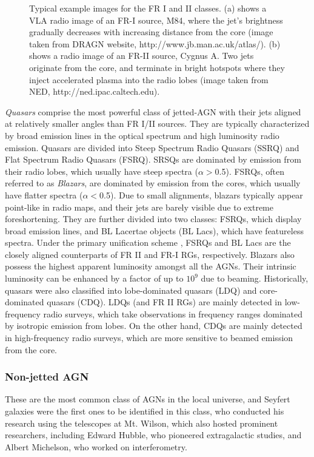 \begin{figure}
    \caption{Typical example images for the FR I and II classes. (a) shows a VLA radio image of an FR-I source, M84, where the jet's brightness gradually decreases with increasing distance from the core (image taken from DRAGN website, http://www.jb.man.ac.uk/atlas/). (b) shows a radio image of an FR-II source, Cygnus A. Two jets originate from the core, and terminate in bright hotspots where they inject accelerated plasma into the radio lobes (image taken from NED, http://ned.ipac.caltech.edu).\label{fig:FR_I_II} }
\end{figure}

\textit{Quasars} comprise the most powerful class of jetted-AGN with their jets aligned at relatively smaller angles than FR I/II sources. They are typically characterized by broad emission lines in the optical spectrum and high luminosity radio emission. Quasars are divided into Steep Spectrum Radio Quasars (SSRQ) and Flat Spectrum Radio Quasars (FSRQ). SRSQs are dominated by emission from their radio lobes, which usually have steep spectra ($\alpha>$0.5). FSRQs, often referred to as \textit{Blazars}, are dominated by emission from the cores, which usually have flatter spectra ($\alpha<$0.5). Due to small alignments, blazars typically appear point-like in radio maps, and their jets are barely visible due to extreme foreshortening. They are further divided into two classes: FSRQs, which display broad emission lines, and BL Lacertae objects (BL Lacs), which have featureless spectra. Under the primary unification scheme 
\citep[e.g.,][]{urry1995unified}, FSRQs and BL Lacs are the closely aligned counterparts of FR II and FR-I RGs, respectively. Blazars also possess the highest apparent luminosity amongst all the AGNs. Their intrinsic luminosity can be enhanced by a factor of up to $10^9$ due to beaming. Historically, quasars were also classified into lobe-dominated quasars (LDQ) and core-dominated quasars (CDQ). LDQs (and FR II RGs) are mainly detected in low-frequency radio surveys, which take observations in frequency ranges dominated by isotropic emission from lobes. On the other hand, CDQs are mainly detected in high-frequency radio surveys, which are more sensitive to beamed emission from the core. 

\subsubsection{Non-jetted AGN}
These are the most common class of AGNs in the local universe, and Seyfert galaxies \citep{seyfert1943nuclear} were the first ones to be identified in this class, who conducted his research using the telescopes at Mt. Wilson, which also hosted prominent researchers, including Edward Hubble, who pioneered extragalactic studies, and Albert Michelson, who worked on interferometry.

